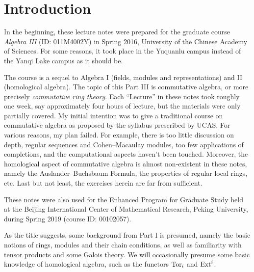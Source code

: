 
\chapter*{Introduction}

In the beginning, these lecture notes were prepared for the graduate course \emph{Algebra III} (ID: 011M4002Y) in Spring 2016, University of the Chinese Academy of Sciences. For some reasons, it took place in the Yuquanlu campus instead of the Yanqi Lake campus as it should be.

The course is a sequel to Algebra I (fields, modules and representations) and II (homological algebra). The topic of this Part III is commutative algebra, or more precisely \emph{commutative ring theory}. Each ``Lecture'' in these notes took roughly one week, say approximately four hours of lecture, but the materials were only partially covered. My initial intention was to give a traditional course on commutative algebra as proposed by the syllabus prescribed by UCAS. For various reasons, my plan failed. For example, there is too little discussion on depth, regular sequences and Cohen--Macaulay modules, too few applications of completions, and the computational aspects haven't been touched. Moreover, the homological aspect of commutative algebra is almost non-existent in these notes, namely the Auslander--Buchsbaum Formula, the properties of regular local rings, etc. Last but not least, the exercises herein are far from sufficient.

These notes were also used for the Enhanced Program for Graduate Study held at the Beijing International Center of Mathematical Research, Peking University, during Spring 2019 (course ID: 00102057).

As the title suggests, some background from Part I is presumed, namely the basic notions of rings, modules and their chain conditions, as well as familiarity with tensor products and some Galois theory. We will occasionally presume some basic knowledge of homological algebra, such as the functors $\operatorname{Tor}_i$ and $\operatorname{Ext}^i$.

